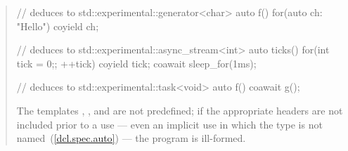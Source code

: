 \begin{quote}
\begin{itemize}
\end{itemize}
\enterexample
\begin{codeblock}
// deduces to std::experimental::generator<char>
auto f() { for(auto ch: "Hello") coyield ch; }

// deduces to std::experimental::async_stream<int>
auto ticks() {
  for(int tick = 0;; ++tick) {
    coyield tick;
    coawait sleep_for(1ms);
  }
}

// deduces to std::experimental::task<void>
auto f() {  coawait g(); }

\end{codeblock}
\exitexample

\pnum
The templates  , 
, and \linebreak
{} are not predefined;
if the appropriate headers are not included prior to a use --- even an implicit use in which the type is not
named~(\ref{dcl.spec.auto}) --- the program is ill-formed.
\end{quote}
